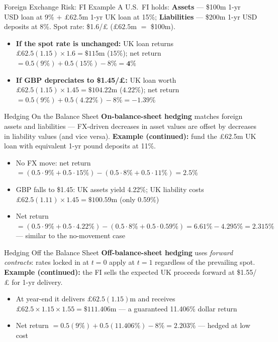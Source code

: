 \documentclass[aspectratio=169]{beamer}
\begin{document}
\begin{frame}{Foreign Exchange Risk: FI Example}
A U.S.\ FI holds: \textbf{Assets} --- \$100m 1-yr USD loan at 9\% $+$ \pounds62.5m 1-yr UK loan at 15\%; \textbf{Liabilities} --- \$200m 1-yr USD deposits at 8\%. Spot rate: \$1.6/\pounds{} ($\pounds 62.5$m $=$ \$100m).
\begin{itemize}
  \item \textbf{If the spot rate is unchanged:} UK loan returns $\pounds62.5(1.15)\times1.6 = \$115$m ($15\%$); net return $= 0.5(9\%) + 0.5(15\%) - 8\% = \mathbf{4\%}$
  \item \textbf{If GBP depreciates to \$1.45/\pounds:} UK loan worth $\pounds62.5(1.15)\times1.45 = \$104.22$m ($4.22\%$); net return $= 0.5(9\%) + 0.5(4.22\%) - 8\% = \mathbf{-1.39\%}$
\end{itemize}
\end{frame}

\begin{frame}{Hedging On the Balance Sheet}
\textbf{On-balance-sheet hedging} matches foreign assets and liabilities --- FX-driven decreases in asset values are offset by decreases in liability values (and vice versa).
\vspace{0.3em}
\textbf{Example (continued):} fund the \pounds62.5m UK loan with equivalent 1-yr pound deposits at 11\%.
\begin{itemize}
  \item No FX move: net return $= (0.5\cdot9\%+0.5\cdot15\%) - (0.5\cdot8\%+0.5\cdot11\%) = 2.5\%$
  \item GBP falls to \$1.45: UK assets yield 4.22\%; UK liability costs $\pounds62.5(1.11)\times1.45 = \$100.59$m (only 0.59\%)
  \item Net return $= (0.5\cdot9\%+0.5\cdot4.22\%) - (0.5\cdot8\%+0.5\cdot0.59\%) = 6.61\% - 4.295\% = \mathbf{2.315\%}$ --- similar to the no-movement case
\end{itemize}
\end{frame}

\begin{frame}{Hedging Off the Balance Sheet}
\textbf{Off-balance-sheet hedging} uses \emph{forward contracts}: rates locked in at $t=0$ apply at $t=1$ regardless of the prevailing spot.
\vspace{0.3em}
\textbf{Example (continued):} the FI sells the expected UK proceeds forward at \$1.55/\pounds{} for 1-yr delivery.
\begin{itemize}
  \item At year-end it delivers $\pounds62.5(1.15)$m and receives $\pounds62.5 \times 1.15 \times 1.55 = \$111.406$m --- a guaranteed 11.406\% dollar return
  \item Net return $= 0.5(9\%) + 0.5(11.406\%) - 8\% = \mathbf{2.203\%}$ --- hedged at low cost
\end{itemize}
\end{frame}
\end{document}
